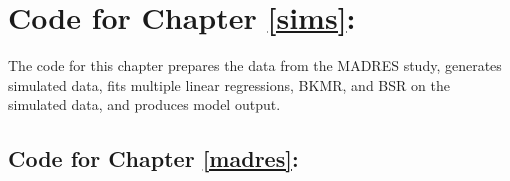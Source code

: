 \documentclass[12pt, twoside]{amherstthesis}
\begin{document}
\hypertarget{code-for-chapter-refsims}{%
\section{Code for Chapter \ref{sims}:}\label{code-for-chapter-refsims}}

The code for this chapter prepares the data from the MADRES study, generates simulated data, fits multiple linear regressions, BKMR, and BSR on the simulated data, and produces model output.

\hypertarget{code-for-chapter-refmadres}{%
\subsection{Code for Chapter \ref{madres}:}\label{code-for-chapter-refmadres}}
\end{document}
